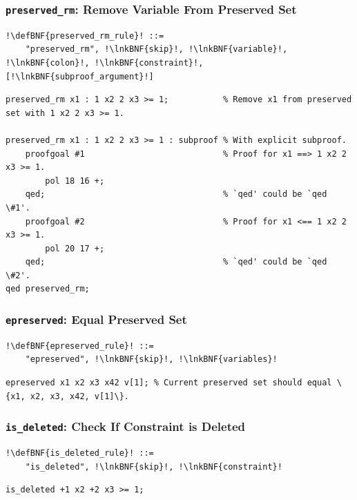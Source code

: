\documentclass[a4paper]{article}
\newcommand{\defBNF}[1]{\hypertarget{def:#1}{<\detokenize{#1}>}}
\newcommand{\lnkBNF}[1]{\hyperlink{def:#1}{<\detokenize{#1}>}}
\begin{document}
\subsubsection{\texttt{preserved\_rm}: Remove Variable From Preserved Set}\label{sec:rules-preserved-rm}
\begin{lstlisting}
!\defBNF{preserved_rm_rule}! ::=
	"preserved_rm", !\lnkBNF{skip}!, !\lnkBNF{variable}!, !\lnkBNF{colon}!, !\lnkBNF{constraint}!, [!\lnkBNF{subproof_argument}!]
\end{lstlisting}
\begin{lstlisting}[language=veripb]
preserved_rm x1 : 1 x2 2 x3 >= 1;           % Remove x1 from preserved set with 1 x2 2 x3 >= 1.

preserved_rm x1 : 1 x2 2 x3 >= 1 : subproof % With explicit subproof.
    proofgoal #1                            % Proof for x1 ==> 1 x2 2 x3 >= 1.
        pol 18 16 +;
    qed;                                    % `qed' could be `qed \#1'.
    proofgoal #2                            % Proof for x1 <== 1 x2 2 x3 >= 1.
        pol 20 17 +;
    qed;                                    % `qed' could be `qed \#2'.
qed preserved_rm;
\end{lstlisting}


\subsubsection{\texttt{epreserved}: Equal Preserved Set}\label{sec:rules-epreserved}
\begin{lstlisting}
!\defBNF{epreserved_rule}! ::=
	"epreserved", !\lnkBNF{skip}!, !\lnkBNF{variables}!
\end{lstlisting}
\begin{lstlisting}[language=veripb]
epreserved x1 x2 x3 x42 v[1]; % Current preserved set should equal \{x1, x2, x3, x42, v[1]\}.
\end{lstlisting}


\subsubsection{\texttt{is\_deleted}: Check If Constraint is Deleted}\label{sec:rules-is-deleted}
\begin{lstlisting}
!\defBNF{is_deleted_rule}! ::=
	"is_deleted", !\lnkBNF{skip}!, !\lnkBNF{constraint}!
\end{lstlisting}
\begin{lstlisting}[language=veripb]
is_deleted +1 x2 +2 x3 >= 1;
\end{lstlisting}
\end{document}
